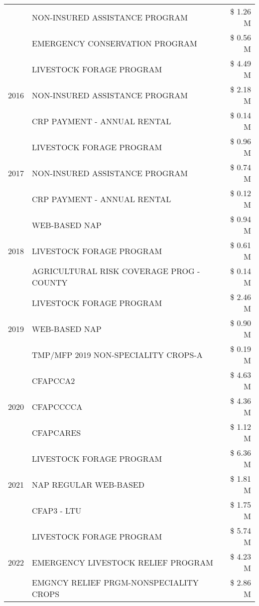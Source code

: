 \begin{tabular}{llr}
 & NON-INSURED ASSISTANCE PROGRAM & \$ 1.26 M \\
 & EMERGENCY CONSERVATION PROGRAM & \$ 0.56 M \\
\cline{1-3}
\multirow[t]{3}{*}{2016} & LIVESTOCK FORAGE PROGRAM & \$ 4.49 M \\
 & NON-INSURED ASSISTANCE PROGRAM & \$ 2.18 M \\
 & CRP PAYMENT - ANNUAL RENTAL & \$ 0.14 M \\
\cline{1-3}
\multirow[t]{3}{*}{2017} & LIVESTOCK FORAGE PROGRAM & \$ 0.96 M \\
 & NON-INSURED ASSISTANCE PROGRAM & \$ 0.74 M \\
 & CRP PAYMENT - ANNUAL RENTAL & \$ 0.12 M \\
\cline{1-3}
\multirow[t]{3}{*}{2018} & WEB-BASED NAP & \$ 0.94 M \\
 & LIVESTOCK FORAGE PROGRAM & \$ 0.61 M \\
 & AGRICULTURAL RISK COVERAGE PROG - COUNTY & \$ 0.14 M \\
\cline{1-3}
\multirow[t]{3}{*}{2019} & LIVESTOCK FORAGE PROGRAM & \$ 2.46 M \\
 & WEB-BASED NAP & \$ 0.90 M \\
 & TMP/MFP 2019 NON-SPECIALITY CROPS-A & \$ 0.19 M \\
\cline{1-3}
\multirow[t]{3}{*}{2020} & CFAPCCA2 & \$ 4.63 M \\
 & CFAPCCCCA & \$ 4.36 M \\
 & CFAPCARES & \$ 1.12 M \\
\cline{1-3}
\multirow[t]{3}{*}{2021} & LIVESTOCK FORAGE PROGRAM & \$ 6.36 M \\
 & NAP REGULAR WEB-BASED & \$ 1.81 M \\
 & CFAP3 - LTU & \$ 1.75 M \\
\cline{1-3}
\multirow[t]{3}{*}{2022} & LIVESTOCK FORAGE PROGRAM & \$ 5.74 M \\
 & EMERGENCY LIVESTOCK RELIEF PROGRAM & \$ 4.23 M \\
 & EMGNCY RELIEF PRGM-NONSPECIALITY CROPS & \$ 2.86 M \\
\cline{1-3}
\bottomrule
\end{tabular}
